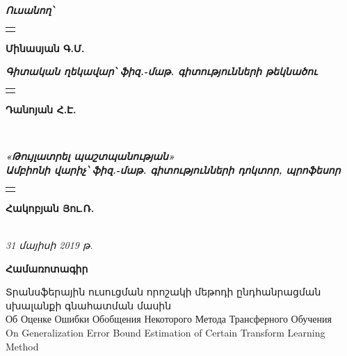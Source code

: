 \documentclass[12pt]{article}
\newcommand{\undertextline}[2]{ {
\renewcommand{\arraystretch}{0.7}
\begin{tabular}{p{#2cm}}
\\
\hline
\centering{{\fontsize{8pt}{8pt} \textit{#1}}}
\end{tabular}} }
\begin{document}
{


{\fontsize{13pt}{13pt} \selectfont \textit{\textbf{Ուսանող՝}}}
 \hspace{0.3cm} \undertextline{ստորագրություն}{7} \hspace{0.3cm}  {\fontsize{13pt}{13pt} \selectfont \textbf{Մինասյան Գ.Մ.}}\\
 
\vspace{5mm}

{\fontsize{13pt}{13pt} \selectfont \textit{\textbf{Գիտական ղեկավար՝  \hspace{0.3cm}ֆիզ.-մաթ. գիտությունների թեկնածու}}}\\


\large{\hspace{4cm} \undertextline{ստորագրություն}{7} \hspace{0.3cm} \hspace{0.3cm}  {\fontsize{13pt}{13pt} \selectfont \textbf{Դանոյան Հ.Է.}}}\\


\vspace{30mm}


{\fontsize{13pt}{13pt} \selectfont \textit{\textbf{«Թույլատրել պաշտպանության»}}}\\

{\fontsize{13pt}{13pt} \selectfont \textit{\textbf{Ամբիոնի վարիչ՝   \hspace{0.3cm}ֆիզ.-մաթ. գիտությունների դոկտոր, պրոֆեսոր}}}\\

\large{\hspace{3.5cm}  \undertextline{ստորագրություն}{7} \hspace{0.3cm} {\fontsize{13pt}{13pt} \selectfont \textbf{Հակոբյան Յու.Ռ.}}  } \\

{\fontsize{13pt}{13pt} \selectfont \textit{{31 մայիսի 2019 թ.}}}
}
\thispagestyle{empty}
\pagebreak






\begin{center}
\Large{\textbf{Համառոտագիր}}
 \end{center}
 \vspace{10mm}
{
\small Տրանսֆերային ուսուցման որոշակի մեթոդի ընդհանրացման սխալանքի գնահատման մասին\\
Об Оценке Ошибки Обобщения Некоторого Метода Трансферного Обучения \\
On Generalization Error Bound Estimation of Certain Transform Learning Method\\
}
\end{document}
